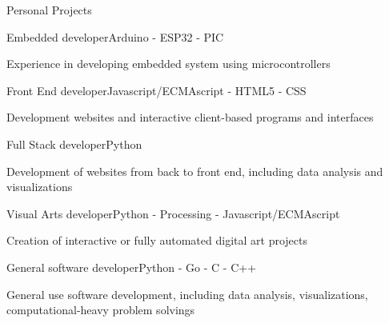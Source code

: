 \documentclass{resume} %
\begin{document}
\begin{rSection}{Personal Projects}

  \begin{rSubsection}{Embedded developer}{Arduino - ESP32 - PIC}{}{}
    \item Experience in developing embedded system using microcontrollers
  \end{rSubsection}

  \begin{rSubsection}{Front End developer}{Javascript/ECMAscript - HTML5 - CSS}{}{}
    \item Development websites and interactive client-based programs and interfaces
  \end{rSubsection}

  \begin{rSubsection}{Full Stack developer}{Python}{}{}
    \item Development of websites from back to front end, including data analysis and visualizations
  \end{rSubsection}

  \begin{rSubsection}{Visual Arts developer}{Python - Processing - Javascript/ECMAscript}{}{}
    \item Creation of interactive or fully automated digital art projects
  \end{rSubsection}

  \begin{rSubsection}{General software developer}{Python - Go - C - C++}{}{}
    \item General use software development, including data analysis, visualizations, computational-heavy problem solvings
  \end{rSubsection}

\end{rSection}


\newpage
\end{document}

